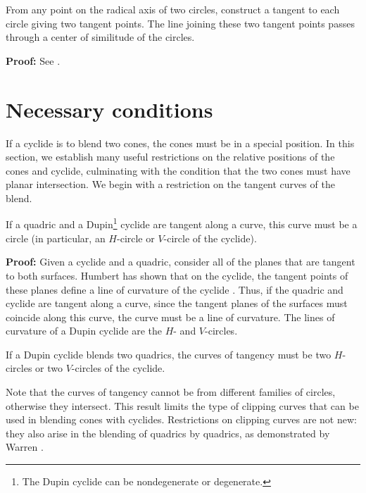 \begin{lemma}
\label{cor:tangent-center}
From any point on the radical axis of two circles, construct a tangent to each
circle giving two tangent points.  
The line joining these two tangent points passes through a center of 
similitude of the circles.
\end{lemma}
{\bf Proof:}
See \cite[Lemma~5.1 and Corollary~5.1]{shenethesis}.
\QED

\section{Necessary conditions}
\label{section:interpolating}

If a cyclide is to blend two cones, the cones must be in a special position.
In this section, we establish many useful restrictions on the relative
positions of the cones and cyclide, culminating with the condition that
the two cones must have planar intersection.
We begin with a restriction on the tangent curves of the blend.

\begin{lemma}
\label{lemma:tan}
If a quadric and a Dupin\footnote{The Dupin 
		cyclide can be nondegenerate or degenerate.}
cyclide are tangent along a curve, this curve
must be a circle (in particular, an $H$-circle or $V$-circle of the cyclide).
\end{lemma}
{\bf Proof:}
Given a cyclide and a quadric, consider all of the planes that are tangent
to both surfaces.
Humbert has shown that on the cyclide, the tangent points of these planes
define a line of curvature of the cyclide \cite{humbert:1885,jessop:1916}.
Thus, if the quadric and cyclide are tangent along a curve, since
the tangent planes of the surfaces must coincide along this curve, the curve
must be a line of curvature.
The lines of curvature of a Dupin cyclide are the $H$- and $V$-circles.
\QED

\begin{cor}
If a Dupin cyclide blends two quadrics, the curves of tangency must be two
$H$-circles or two $V$-circles of the cyclide.
\end{cor}

Note that the curves of tangency cannot be from different families of circles,
otherwise they intersect.
This result limits the type of clipping curves that can be used in blending
cones with cyclides.
Restrictions on clipping curves are not new: they also arise in the blending
of quadrics by quadrics, as demonstrated by Warren \cite{warren:1987}.

